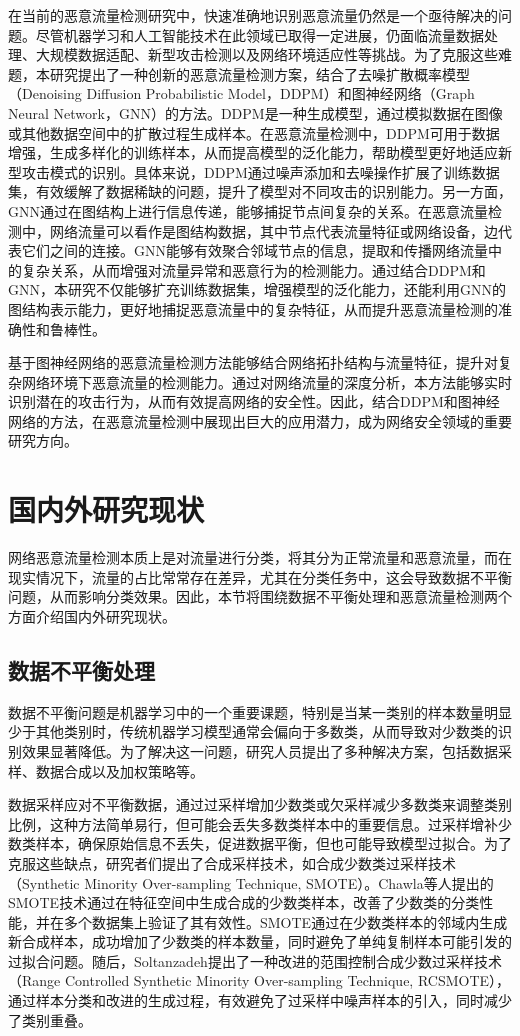 \documentclass[promaster]{thesis-uestc}
\begin{document}
在当前的恶意流量检测研究中，快速准确地识别恶意流量仍然是一个亟待解决的问题。尽管机器学习和人工智能技术在此领域已取得一定进展，仍面临流量数据处理、大规模数据适配、新型攻击检测以及网络环境适应性等挑战。为了克服这些难题，本研究提出了一种创新的恶意流量检测方案，结合了去噪扩散概率模型（Denoising Diffusion Probabilistic Model，DDPM）和图神经网络（Graph Neural Network，GNN）的方法。DDPM是一种生成模型，通过模拟数据在图像或其他数据空间中的扩散过程生成样本。在恶意流量检测中，DDPM可用于数据增强，生成多样化的训练样本，从而提高模型的泛化能力，帮助模型更好地适应新型攻击模式的识别。具体来说，DDPM通过噪声添加和去噪操作扩展了训练数据集，有效缓解了数据稀缺的问题，提升了模型对不同攻击的识别能力。另一方面，GNN通过在图结构上进行信息传递，能够捕捉节点间复杂的关系。在恶意流量检测中，网络流量可以看作是图结构数据，其中节点代表流量特征或网络设备，边代表它们之间的连接。GNN能够有效聚合邻域节点的信息，提取和传播网络流量中的复杂关系，从而增强对流量异常和恶意行为的检测能力。通过结合DDPM和GNN，本研究不仅能够扩充训练数据集，增强模型的泛化能力，还能利用GNN的图结构表示能力，更好地捕捉恶意流量中的复杂特征，从而提升恶意流量检测的准确性和鲁棒性。

基于图神经网络的恶意流量检测方法能够结合网络拓扑结构与流量特征，提升对复杂网络环境下恶意流量的检测能力。通过对网络流量的深度分析，本方法能够实时识别潜在的攻击行为，从而有效提高网络的安全性。因此，结合DDPM和图神经网络的方法，在恶意流量检测中展现出巨大的应用潜力，成为网络安全领域的重要研究方向。
\section{国内外研究现状}
网络恶意流量检测本质上是对流量进行分类，将其分为正常流量和恶意流量，而在现实情况下，流量的占比常常存在差异，尤其在分类任务中，这会导致数据不平衡问题，从而影响分类效果。因此，本节将围绕数据不平衡处理和恶意流量检测两个方面介绍国内外研究现状。 

\subsection{数据不平衡处理}


数据不平衡问题是机器学习中的一个重要课题，特别是当某一类别的样本数量明显少于其他类别时，传统机器学习模型通常会偏向于多数类，从而导致对少数类的识别效果显著降低。为了解决这一问题，研究人员提出了多种解决方案，包括数据采样、数据合成以及加权策略等。

数据采样应对不平衡数据，通过过采样增加少数类或欠采样减少多数类来调整类别比例，这种方法简单易行，但可能会丢失多数类样本中的重要信息。过采样增补少数类样本，确保原始信息不丢失，促进数据平衡，但也可能导致模型过拟合。为了克服这些缺点，研究者们提出了合成采样技术，如合成少数类过采样技术（Synthetic Minority Over-sampling Technique, SMOTE）。Chawla等人提出的SMOTE技术通过在特征空间中生成合成的少数类样本，改善了少数类的分类性能，并在多个数据集上验证了其有效性。SMOTE通过在少数类样本的邻域内生成新合成样本，成功增加了少数类的样本数量，同时避免了单纯复制样本可能引发的过拟合问题。随后，Soltanzadeh提出了一种改进的范围控制合成少数过采样技术（Range Controlled Synthetic Minority Over-sampling Technique, RCSMOTE），通过样本分类和改进的生成过程，有效避免了过采样中噪声样本的引入，同时减少了类别重叠。
\end{document}
